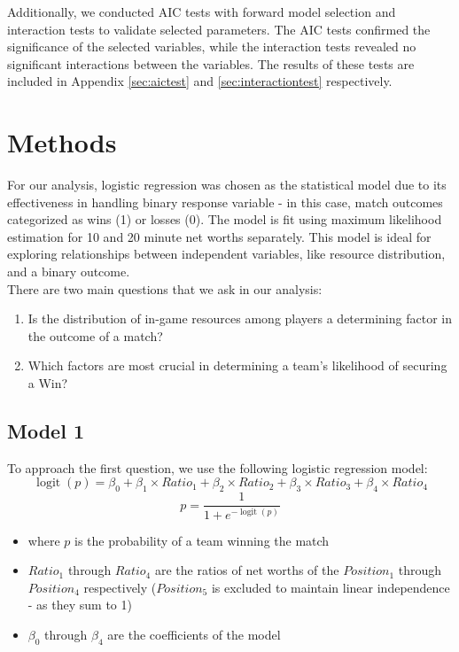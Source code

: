 \documentclass[11pt]{article}
\DeclareMathOperator{\logit}{logit}
\begin{document}
Additionally, we conducted AIC tests with forward model selection and interaction
tests to validate selected parameters. The AIC tests confirmed the significance
of the selected variables, while the interaction tests revealed no significant
interactions between the variables. The results of these tests are included in
Appendix \ref{sec:aictest} and \ref{sec:interactiontest} respectively.

\section{Methods}
For our analysis, logistic regression was chosen as the statistical model due
to its effectiveness in handling binary response variable - in this case, match
outcomes categorized as wins (1) or losses (0). The model is fit using maximum
likelihood estimation for 10 and 20 minute net worths separately. This model is
ideal for exploring relationships between independent variables, like resource
distribution, and a binary outcome.
\\[\baselineskip]
There are two main questions that we ask in our analysis:
\begin{enumerate}
    \item Is the distribution of in-game resources among players a determining
    factor in the outcome of a match?
    \item Which factors are most crucial in determining a team's likelihood
    of securing a Win?
\end{enumerate}

\subsection{Model 1}
To approach the first question, we use the following logistic regression model:
\[\logit(p) = \beta_0 + \beta_1 \times Ratio_1 + \beta_2 \times Ratio_2 + \beta_3 \times Ratio_3 + \beta_4 \times Ratio_4\]
\[p = \frac{1}{1 + e^{-\logit(p)}}\]
\begin{itemize}
    \item where \(p\) is the probability of a team winning the match
    \item \(Ratio_1\) through \(Ratio_4\) are the ratios of net worths of the
    \(Position_1\) through \(Position_4\) respectively (\(Position_5\) is excluded
    to maintain linear independence - as they sum to 1)
    \item \(\beta_0\) through \(\beta_4\) are the coefficients of the model
\end{itemize}
\end{document}
